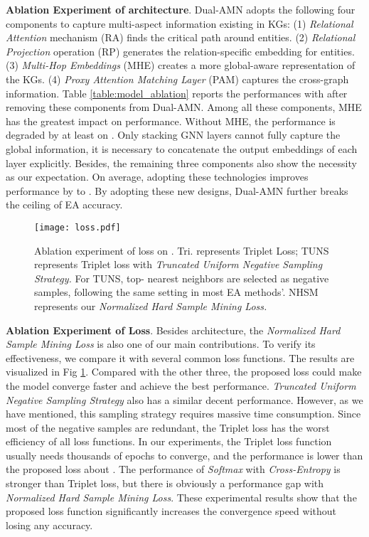 \documentclass[sigconf]{acmart}
\begin{document}
\noindent
\textbf{Ablation Experiment of architecture}.
Dual-AMN adopts the following four components to capture multi-aspect information existing in KGs:
(1) \emph{Relational Attention} mechanism (RA) finds the critical path around entities.
(2) \emph{Relational Projection} operation (RP) generates the relation-specific embedding for entities.
(3) \emph{Multi-Hop Embeddings} (MHE) creates a more global-aware representation of the KGs.
(4) \emph{Proxy Attention Matching Layer} (PAM) captures the cross-graph information.
Table \ref{table:model_ablation} reports the performances with  after removing these components from Dual-AMN.
Among all these components, MHE has the greatest impact on performance.
Without MHE, the performance is degraded by at least  on .
Only stacking GNN layers cannot fully capture the global information, it is necessary to concatenate the output embeddings of each layer explicitly.
Besides, the remaining three components also show the necessity as our expectation.
On average, adopting these technologies improves performance by  to .
By adopting these new designs, Dual-AMN further breaks the ceiling of EA accuracy.

\begin{figure}
  \centering
  \texttt{[image: loss.pdf]}
  \caption{Ablation experiment of loss on .
  Tri. represents Triplet Loss;
  TUNS represents Triplet loss with \emph{Truncated Uniform Negative Sampling Strategy.}
  For TUNS, top- nearest neighbors are selected as negative samples, following the same setting in most EA methods'.
  NHSM represents our \emph{Normalized Hard Sample Mining Loss.}}\label{Figure:loss}
\end{figure}
\noindent
\textbf{Ablation Experiment of Loss}.
Besides architecture, the \emph{Normalized Hard Sample Mining Loss} is also one of our main contributions.
To verify its effectiveness, we compare it with several common loss functions.
The results are visualized in Fig \ref{Figure:loss}.
Compared with the other three, the proposed loss could make the model converge faster and achieve the best performance.
\emph{Truncated Uniform Negative Sampling Strategy} also has a similar decent performance.
However, as we have mentioned, this sampling strategy requires massive time consumption.
Since most of the negative samples are redundant, the Triplet loss has the worst efficiency of all loss functions.
In our experiments, the Triplet loss function usually needs thousands of epochs to converge, and the performance is lower than the proposed loss about .
The performance of \emph{Softmax} with \emph{Cross-Entropy} is stronger than Triplet loss, but there is obviously a performance gap with \emph{Normalized Hard Sample Mining Loss}.
These experimental results show that the proposed loss function significantly increases the convergence speed without losing any accuracy.
\end{document}
